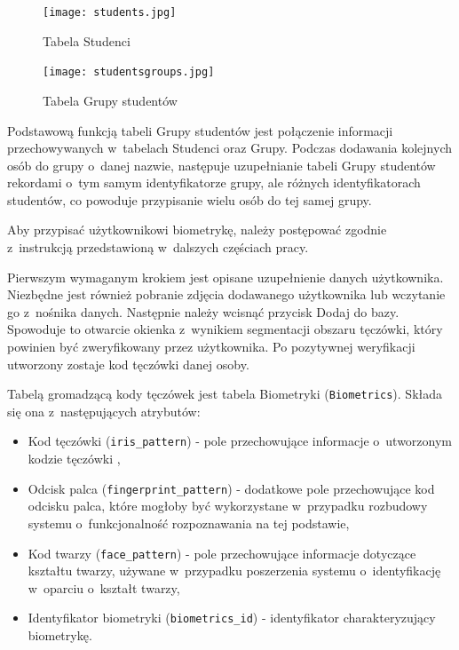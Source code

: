 \begin{figure}
\begin{center}
\texttt{[image: students.jpg]}
\caption{Tabela Studenci}
\label{fig:studens}
\end{center}
\end{figure}
\begin{figure}
\begin{center}
\texttt{[image: studentsgroups.jpg]}
\caption{Tabela Grupy studentów}
\label{fig:studentsgroups}
\end{center}
\end{figure}

Podstawową funkcją tabeli Grupy studentów jest połączenie informacji przechowywanych w~tabelach Studenci oraz Grupy. Podczas dodawania kolejnych osób do grupy o~danej nazwie, następuje uzupełnianie tabeli Grupy studentów rekordami o~tym samym identyfikatorze grupy, ale różnych identyfikatorach studentów, co powoduje przypisanie wielu osób do tej samej grupy.

Aby przypisać użytkownikowi biometrykę, należy postępować zgodnie z~instrukcją przedstawioną w~dalszych częściach pracy.

Pierwszym wymaganym krokiem jest opisane uzupełnienie danych użytkownika. Niezbędne jest również pobranie zdjęcia dodawanego użytkownika lub wczytanie  go z~nośnika danych. Następnie należy wcisnąć przycisk Dodaj do bazy. Spowoduje to otwarcie okienka z~wynikiem segmentacji obszaru tęczówki, który powinien być zweryfikowany przez użytkownika. Po pozytywnej weryfikacji utworzony zostaje kod tęczówki danej osoby.

 Tabelą gromadzącą kody tęczówek jest tabela Biometryki (\verb!Biometrics!). Składa się ona z~następujących atrybutów:
\begin{itemize}
\item Kod tęczówki (\verb!iris_pattern!) - pole przechowujące informacje o~utworzonym kodzie tęczówki ,
\item Odcisk palca (\verb!fingerprint_pattern!) - dodatkowe pole przechowujące kod odcisku palca, które mogłoby być wykorzystane w~przypadku rozbudowy systemu o~funkcjonalność rozpoznawania na tej podstawie,
\item Kod twarzy (\verb!face_pattern!) - pole przechowujące informacje dotyczące kształtu twarzy, używane w~przypadku poszerzenia systemu o~identyfikację w~oparciu o~kształt twarzy,
\item Identyfikator biometryki (\verb!biometrics_id!) - identyfikator charakteryzujący biometrykę.
\end{itemize}

